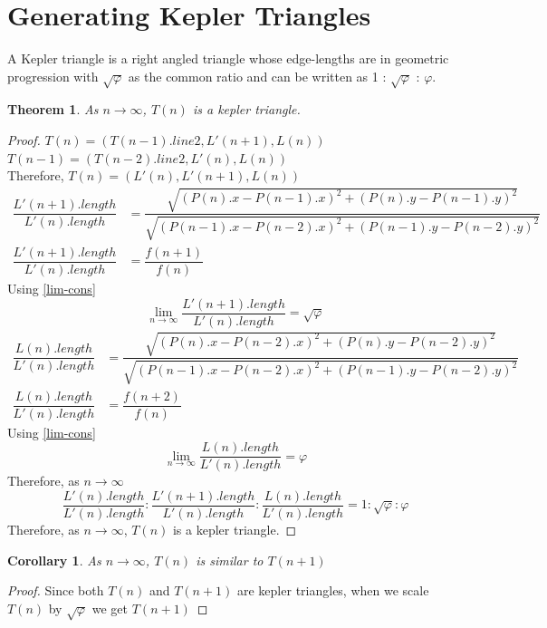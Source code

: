 \documentclass[preprint,12pt]{elsarticle}
\newtheorem{theorem}{Theorem}[section]
\newtheorem{corollary}{Corollary}[theorem]
\begin{document}
	\section{Generating Kepler Triangles}
	A Kepler triangle is a right angled triangle whose edge-lengths are in geometric progression with $\sqrt{\varphi}$ as the common ratio and can be written as 1 : $\sqrt{\varphi}$ : $\varphi$\cite{KT-wiki}.
	\begin{theorem}
		As $n \to \infty$, $T(n)$ is a kepler triangle.
	\end{theorem}
	\begin{proof}
		$T(n) = (T(n-1).line2, L'(n+1), L(n))$\\
		$T(n-1) = (T(n-2).line2, L'(n), L(n))$\\
		Therefore, $T(n) = (L'(n), L'(n+1), L(n))$
		\begin{align*}
		\dfrac{L'(n+1).length}{L'(n).length} &= \dfrac{\sqrt{(P(n).x - P(n-1).x)^2 + (P(n).y-P(n-1).y)^2}}{\sqrt{(P(n-1).x - P(n-2).x)^2 + (P(n-1).y-P(n-2).y)^2}}\\
		\dfrac{L'(n+1).length}{L'(n).length} &= \dfrac{f(n+1)}{f(n)}
		\end{align*}
		Using \ref{lim-cons}
		$$\lim_{n \to \infty} \dfrac{L'(n+1).length}{L'(n).length} = \sqrt{\varphi}$$
		\begin{align*}
		\dfrac{L(n).length}{L'(n).length} &= \dfrac{\sqrt{(P(n).x - P(n-2).x)^2 + (P(n).y-P(n-2).y)^2}}{\sqrt{(P(n-1).x - P(n-2).x)^2 + (P(n-1).y-P(n-2).y)^2}}\\
		\dfrac{L(n).length}{L'(n).length} &= \dfrac{f(n+2)}{f(n)}
		\end{align*}
		Using \ref{lim-cons}
		$$\lim_{n \to \infty} \dfrac{L(n).length}{L'(n).length} = \varphi$$
		Therefore, as $n \to \infty$
		$$\dfrac{L'(n).length}{L'(n).length} : \dfrac{L'(n+1).length}{L'(n).length} : \dfrac{L(n).length}{L'(n).length} = 1 : \sqrt{\varphi} : \varphi $$
		Therefore, as $n \to \infty$, $T(n)$ is a kepler triangle.
	\end{proof}
	\begin{corollary}
		As $n \to \infty$, $T(n)$ is similar to $T(n+1)$
	\end{corollary}
	\begin{proof}
		Since both $T(n)$ and $T(n+1)$ are kepler triangles, when we scale $T(n)$ by $\sqrt{\varphi}$ we get $T(n+1)$
	\end{proof}
\end{document}
